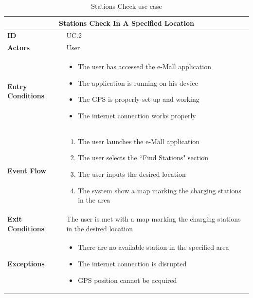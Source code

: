\documentclass[12pt]{report}
\begin{document}
    \begin{table}[h]
        \centering
        \begin{tabular}{ |p{4cm}|p{11cm}|  }
        \hline
        \multicolumn{2}{|c|}{\textbf{Stations Check In A Specified Location}} \\
        \hline
            \textbf{ID} &  UC.2\\
        \hline
            \textbf{Actors} & User\\
        \hline
            \textbf{Entry Conditions} &
                \begin{itemize}
                    \item The user has accessed the e-Mall application
                    \item The application is running on his device
                    \item The GPS is properly set up and working
                    \item The internet connection works properly
                \end{itemize}\\
        \hline
            \textbf{Event Flow} &
                \begin{enumerate}
                    \item The user launches the e-Mall application
                    \item The user selects the “Find Stations" 
                    section
                    \item The user inputs the desired location
                    \item The system show a map marking the charging stations in the area
                \end{enumerate}\\
        \hline
            \textbf{Exit Conditions} & The user is met with a map marking the charging stations in the desired location\\
        \hline
            \textbf{Exceptions} &
                \begin{itemize}
                    \item There are no available station in the specified area
                    \item The internet connection is disrupted
                    \item GPS position cannot be acquired
                \end{itemize}\\
        \hline
        \end{tabular}
        \caption{\label{demo-table}Stations Check use case}
    \end{table}
\clearpage
\end{document}
